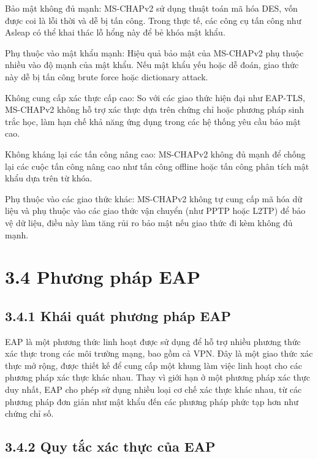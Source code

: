 Bảo mật không đủ mạnh: MS-CHAPv2 sử dụng thuật toán mã hóa DES, vốn được coi là lỗi thời và dễ bị tấn công. Trong thực tế, các công cụ tấn công như Asleap có thể khai thác lỗ hổng này để bẻ khóa mật khẩu.

Phụ thuộc vào mật khẩu mạnh: Hiệu quả bảo mật của MS-CHAPv2 phụ thuộc nhiều vào độ mạnh của mật khẩu. Nếu mật khẩu yếu hoặc dễ đoán, giao thức này dễ bị tấn công brute force hoặc dictionary attack.

Không cung cấp xác thực cấp cao: So với các giao thức hiện đại như EAP-TLS, MS-CHAPv2 không hỗ trợ xác thực dựa trên chứng chỉ hoặc phương pháp sinh trắc học, làm hạn chế khả năng ứng dụng trong các hệ thống yêu cầu bảo mật cao.

Không kháng lại các tấn công nâng cao: MS-CHAPv2 không đủ mạnh để chống lại các cuộc tấn công nâng cao như tấn công offline hoặc tấn công phân tích mật khẩu dựa trên từ khóa.

Phụ thuộc vào các giao thức khác: MS-CHAPv2 không tự cung cấp mã hóa dữ liệu và phụ thuộc vào các giao thức vận chuyển (như PPTP hoặc L2TP) để bảo vệ dữ liệu, điều này làm tăng rủi ro bảo mật nếu giao thức đi kèm không đủ mạnh.

 \section*{3.4 Phương pháp EAP }
 \subsection*{3.4.1 Khái quát phương pháp EAP }

EAP là một phương thức linh hoạt được sử dụng để hỗ trợ nhiều phương thức xác thực trong các môi trường mạng, bao gồm cả VPN. Đây là một giao thức xác thực mở rộng, được thiết kế để cung cấp một khung làm việc linh hoạt cho các phương pháp xác thực khác nhau. Thay vì giới hạn ở một phương pháp xác thực duy nhất, EAP cho phép sử dụng nhiều loại cơ chế xác thực khác nhau, từ các phương pháp đơn giản như mật khẩu đến các phương pháp phức tạp hơn như chứng chỉ số.

  \subsection*{3.4.2 Quy tắc xác thực của EAP }

